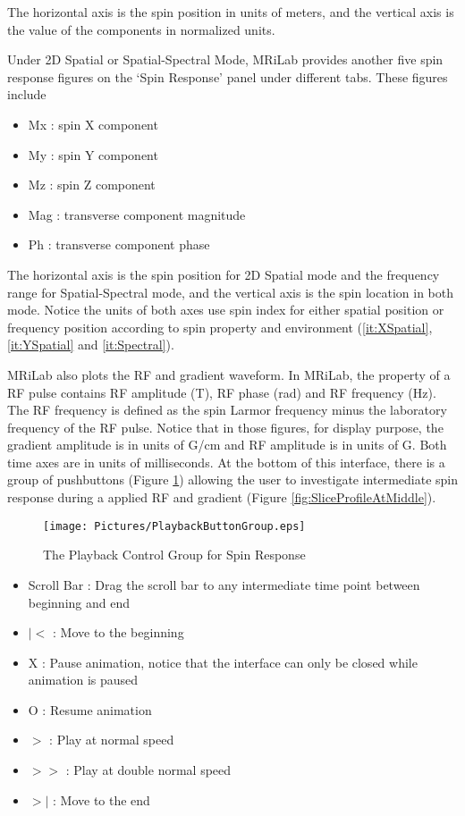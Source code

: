 \documentclass{book}%
\begin{document}
\begin{enumerate}
The horizontal axis is the spin position in units of meters, and the vertical axis is the value of the components in normalized units. 

Under 2D Spatial or Spatial-Spectral Mode, MRiLab provides another five spin response figures on the `Spin Response' panel under different tabs. These figures include

\begin{itemize}
	\item Mx : spin X component
	\item My : spin Y component
	\item Mz : spin Z component
	\item Mag : transverse component magnitude
	\item Ph : transverse component phase
\end{itemize}

The horizontal axis is the spin position for 2D Spatial mode and the frequency range for Spatial-Spectral mode, and the vertical axis is the spin location in both mode. Notice the units of both axes use spin index for either spatial position or frequency position according to spin property and environment (\ref{it:XSpatial}, \ref{it:YSpatial} and \ref{it:Spectral}). 

MRiLab also plots the RF and gradient waveform. In MRiLab, the property of a RF pulse contains RF amplitude (T), RF phase (rad) and RF frequency (Hz). The RF frequency is defined as the spin Larmor frequency minus the laboratory frequency of the RF pulse. Notice that in those figures, for display purpose, the gradient amplitude is in units of G/cm and RF amplitude is in units of G. Both time axes are in units of milliseconds. At the bottom of this interface, there is a group of pushbuttons (Figure \ref{fig:PlaybackButtonGroup}) allowing the user to investigate intermediate spin response during a applied RF and gradient (Figure \ref{fig:SliceProfileAtMiddle}). 

\begin{figure}[htbp]
	\centering
		\texttt{[image: Pictures/PlaybackButtonGroup.eps]}
	\caption{The Playback Control Group for Spin Response}
	\label{fig:PlaybackButtonGroup}
\end{figure}

\begin{itemize}
	\item Scroll Bar : Drag the scroll bar to any intermediate time point between beginning and end 
	\item $\vert <$ : Move to the beginning
	\item X : Pause animation, notice that the interface can only be closed while animation is paused
	\item O : Resume animation
	\item $> $ : Play at normal speed
	\item $>>$ : Play at double normal speed
	\item $> \vert$ : Move to the end
\end{itemize}


\end{enumerate}
\end{document}
